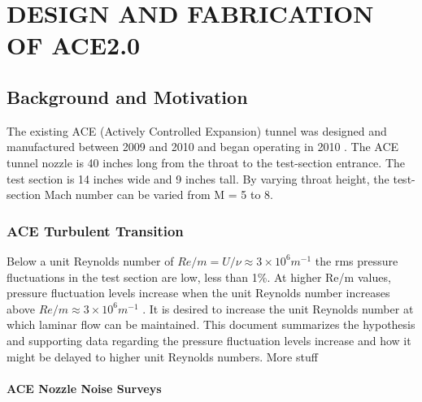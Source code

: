 %
%  
%



\chapter{DESIGN AND FABRICATION OF ACE2.0}

\section{Background and Motivation}

The existing ACE (Actively Controlled Expansion) tunnel was designed and manufactured between 2009 and 2010 and began operating in 2010 \cite{ace09,ace10-calibrate,tichenor-dis}. The ACE tunnel nozzle is 40 inches long from the throat to the test-section entrance. The test section is 14 inches wide and 9 inches tall. By varying throat height, the test-section Mach number can be varied from M = 5 to 8.

\subsection{ACE Turbulent Transition}

Below a unit Reynolds number of $Re/m = U/\nu \approx 3 \times 10^6 m^{-1}$ the rms pressure fluctuations in the test section are low, less than 1\%. At higher Re/m values, pressure fluctuation levels increase when the unit Reynolds number increases above $Re/m \approx 3 \times 10^6 m^{-1}$ \cite{aceturb}. It is desired to increase the unit Reynolds number at which laminar flow can be maintained. This document summarizes the hypothesis and supporting data regarding the pressure fluctuation levels increase and how it might be delayed to higher unit Reynolds numbers.
More stuff

\subsubsection{ACE Nozzle Noise Surveys}

